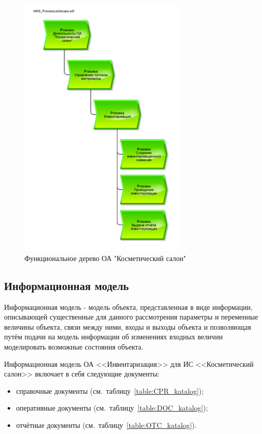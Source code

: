 \begin{figure}[!h]
    \centering

    \includegraphics[width=8cm, angle=90]
    {assets/ARIS/ARIS_ProcessLandscape.adf.pdf}

    \caption{Функциональное дерево ОА "Косметический салон"}

    \label{fig:ARIS_ProcessLandscape}
\end{figure}

\newpage
\subsection{Информационная модель}
Информационная модель - модель объекта, представленная в виде информации,
описывающей существенные для данного рассмотрения параметры и переменные величины объекта,
связи между ними, входы и выходы объекта и позволяющая путём подачи на модель информации об изменениях
входных величин моделировать возможные состояния объекта.

Информационная модель ОА <<Инвентаризация>> для ИС <<Косметический салон>> включает в себя следующие документы:

\begin{itemize}
    \item справочные документы (см.~таблицу~\ref{table:CPR_katalog});
    \item оперативные документы (см.~таблицу~\ref{table:DOC_katalog});
    \item отчётные документы (см.~таблицу~\ref{table:OTC_katalog}).
\end{itemize}

